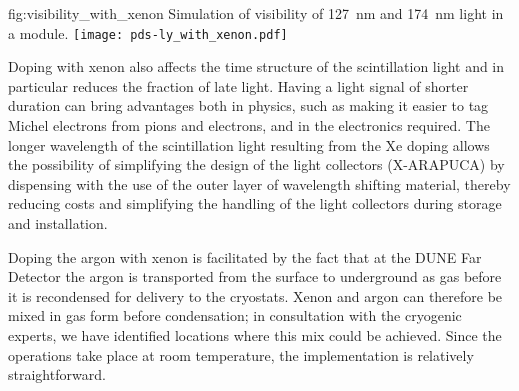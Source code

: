 \begin{dunefigure}
{fig:visibility_with_xenon}
{Simulation of visibility of \SI{127}{nm} and \SI{174}{nm} light in a  module.}
\texttt{[image: pds-ly\_with\_xenon.pdf]}
\end{dunefigure}

Doping with xenon also affects the time structure of the scintillation light and in particular reduces the fraction of late light.  Having a light signal of shorter duration can bring advantages both in physics, such as making it easier to tag Michel electrons from pions and electrons, and in the electronics required. The longer wavelength of the scintillation light resulting from the Xe doping allows the possibility of simplifying the design of the  light collectors (X-ARAPUCA) by dispensing with the use of the outer layer of wavelength shifting material, thereby reducing costs and simplifying the handling of the light collectors during storage and installation. 


Doping the argon with xenon is facilitated by the fact that at the DUNE Far Detector the argon is transported from the surface to underground as gas before it is recondensed for delivery to the cryostats. Xenon and argon can therefore be mixed in gas form before condensation;  in consultation with the cryogenic experts, we have identified locations where this mix could be achieved. Since the operations take place at room temperature, the implementation is relatively straightforward.



